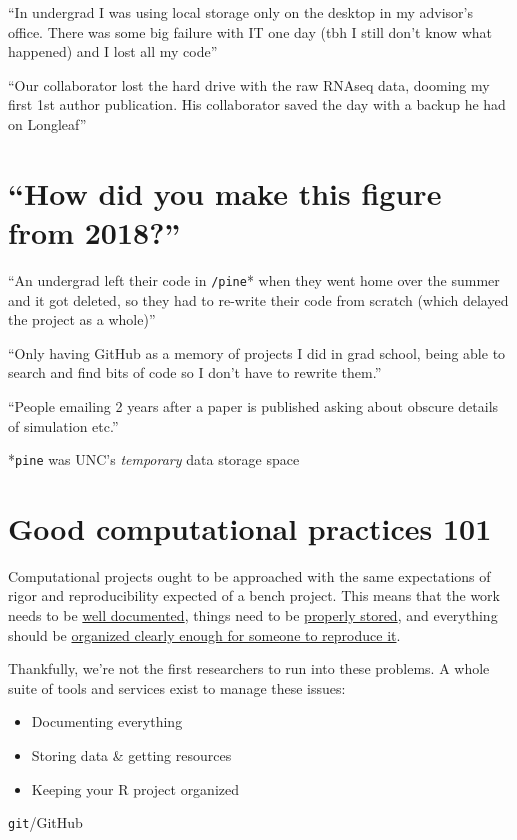\documentclass[
  letterpaper,
  DIV=11,
  numbers=noendperiod]{scrreprt}
\begin{document}
``In undergrad I was using local storage only on the desktop in my
advisor's office. There was some big failure with IT one day (tbh I
still don't know what happened) and I lost all my code''

``Our collaborator lost the hard drive with the raw RNAseq data, dooming
my first 1st author publication. His collaborator saved the day with a
backup he had on Longleaf''

\section{``How did you make this figure from 2018?''}

``An undergrad left their code in \texttt{/pine}* when they went home
over the summer and it got deleted, so they had to re-write their code
from scratch (which delayed the project as a whole)''

``Only having GitHub as a memory of projects I did in grad school, being
able to search and find bits of code so I don't have to rewrite them.''

``People emailing 2 years after a paper is published asking about
obscure details of simulation etc.''

*\texttt{pine} was UNC's \emph{temporary} data storage space

\section{Good computational practices
101}\label{good-computational-practices-101}

Computational projects ought to be approached with the same expectations
of rigor and reproducibility expected of a bench project. This means
that the work needs to be \ul{well documented}, things need to be
\ul{properly stored}, and everything should be \ul{organized clearly
enough for someone to reproduce it}.

Thankfully, we're not the first researchers to run into these problems.
A whole suite of tools and services exist to manage these issues:

\begin{itemize}
\item
  Documenting everything
\item
  Storing data \& getting resources
\item
  Keeping your R project organized
\end{itemize}

\texttt{git}/GitHub
\end{document}
